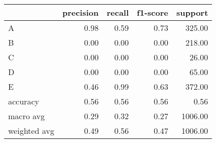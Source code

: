 \begin{tabular}{|l|r|r|r|r|}
\hline
{} &  precision &  recall &  f1-score &  support \\
\hline
A            &       0.98 &    0.59 &      0.73 &   325.00 \\
B            &       0.00 &    0.00 &      0.00 &   218.00 \\
C            &       0.00 &    0.00 &      0.00 &    26.00 \\
D            &       0.00 &    0.00 &      0.00 &    65.00 \\
E            &       0.46 &    0.99 &      0.63 &   372.00 \\
accuracy     &       0.56 &    0.56 &      0.56 &     0.56 \\
macro avg    &       0.29 &    0.32 &      0.27 &  1006.00 \\
weighted avg &       0.49 &    0.56 &      0.47 &  1006.00 \\
\hline
\end{tabular}
